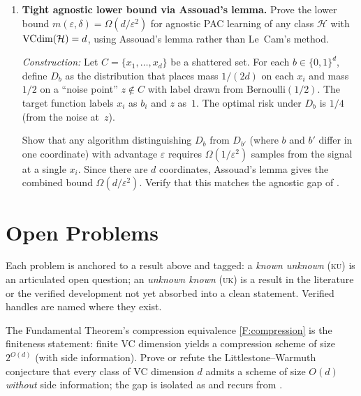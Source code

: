 \begin{enumerate}[leftmargin=*,itemsep=6pt]
\item \textbf{Tight agnostic lower bound via Assouad's lemma.}
  Prove the lower bound
  $m(\varepsilon, \delta) = \Omega(d/\varepsilon^2)$ for agnostic
  PAC learning of any class $\mathcal{H}$ with $\mathrm{VCdim}(\mathcal{H}) = d$,
  using Assouad's lemma rather than Le~Cam's method.

  \emph{Construction:} Let $C = \{x_1, \ldots, x_d\}$ be a shattered
  set.  For each $b \in \{0,1\}^d$, define $D_b$ as the distribution
  that places mass $1/(2d)$ on each $x_i$ and mass $1/2$ on a
  ``noise point'' $z \notin C$ with label drawn from
  $\mathrm{Bernoulli}(1/2)$.  The target function labels $x_i$ as
  $b_i$ and $z$ as~$1$.  The optimal risk under $D_b$ is $1/4$ (from
  the noise at~$z$).

  Show that any algorithm distinguishing $D_b$ from $D_{b'}$ (where
  $b$ and $b'$ differ in one coordinate) with advantage $\varepsilon$
  requires $\Omega(1/\varepsilon^2)$ samples from the signal at
  a single $x_i$.  Since there are $d$ coordinates, Assouad's
  lemma gives the combined bound $\Omega(d/\varepsilon^2)$.  Verify
  that this matches the agnostic gap of .

\end{enumerate}

\section{Open Problems}
\label{sec:ch5-open}

Each problem is anchored to a result above and tagged: a \emph{known unknown} (\textsc{ku}) is an articulated open question; an \emph{unknown known} (\textsc{uk}) is a result in the literature or the verified development not yet absorbed into a clean statement.  Verified handles are named where they exist.

\begin{openprob}
\label{op:compression-od}
The Fundamental Theorem's compression equivalence \ref{F:compression} is the finiteness statement: finite VC dimension yields a compression scheme of size $2^{O(d)}$ (with side information). Prove or refute the Littlestone--Warmuth conjecture that every class of VC dimension $d$ admits a scheme of size $O(d)$ \emph{without} side information; the gap is isolated as  and recurs from .
\end{openprob}

